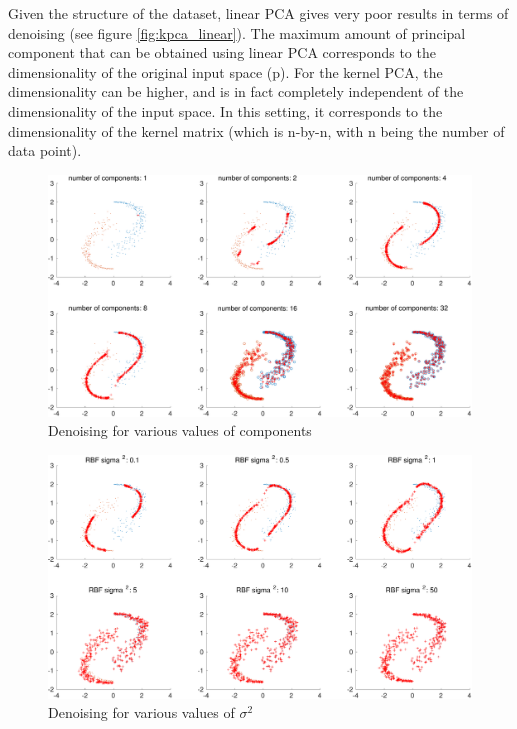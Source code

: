 \documentclass[11pt, a4paper]{article}
\begin{document}
Given the structure of the dataset, linear PCA gives very poor results
in terms of denoising (see figure \ref{fig:kpca_linear}). The maximum
amount of principal component that can be obtained using linear PCA
corresponds to the dimensionality of the original input space (p). For
the kernel PCA, the dimensionality can be higher, and is in fact
completely independent of the dimensionality of the input space. In
this setting, it corresponds to the dimensionality of the kernel
matrix (which is n-by-n, with n being the number of data point).

\begin{figure}[H]
  \centering
  \includegraphics[scale=.35]{kpca_ncomp.pdf}
  \caption{Denoising for various values of components}
  \label{fig:kpca_ncomp}
\end{figure}

\begin{figure}[H]
  \centering
  \includegraphics[scale=.35]{kpca_sigma.pdf}
  \caption{Denoising for various values of $\sigma^2$}
  \label{fig:kpca_sigma}
\end{figure}
\end{document}
